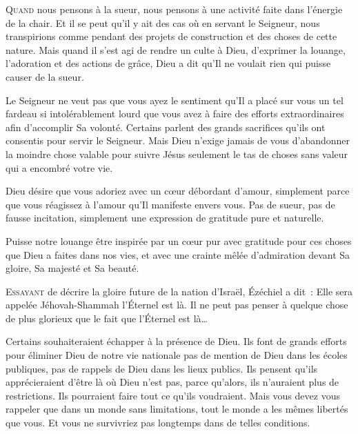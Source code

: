 \lettrine{Q}{uand} nous pensons à la sueur,
 nous pensons à une activité faite dans l'énergie de la chair.
 Et il se peut qu'il y ait des cas où en servant le Seigneur,
 nous transpirions \ocadr comme pendant des projets de construction
 et des choses de cette nature. Mais quand il s'est agi de rendre
 un culte à Dieu, d'exprimer la louange, l'adoration
 et des actions de grâce, Dieu a dit qu'Il ne voulait rien
 qui puisse causer de la sueur. 



Le Seigneur ne veut pas que vous ayez le sentiment qu'Il a placé sur vous
 un tel fardeau si intolérablement lourd que vous avez à faire des efforts
 extraordinaires afin d'accomplir Sa volonté. Certains parlent
 des grands sacrifices 
qu'ils ont consentis pour servir le Seigneur.
 Mais Dieu n'exige jamais de vous d'abandonner la moindre chose valable
 pour suivre Jésus \ocadr seulement le tas de choses sans valeur
 qui a encombré votre vie. 

Dieu désire que vous adoriez avec un c\oe{}ur débordant d'amour,
 simplement parce que vous réagissez à l'amour qu'Il manifeste envers vous.
 Pas de sueur, pas de fausse incitation,
 simplement une expression de gratitude pure et naturelle. 

Puisse notre louange être inspirée par un c\oe{}ur pur
 \ocadr avec gratitude pour ces choses que Dieu a faites dans nos vies, 
et avec une crainte mêlée d'admiration devant Sa gloire,
 Sa majesté et Sa beauté. 

\dvrule






\lettrine{E}{ssayant} de décrire la gloire future de la nation d'Israël,
 Ézéchiel a dit~: 
 \Og Elle sera appelée Jéhovah-Shammah \ocadr l'Éternel est là. \Fg{}
 Il ne peut pas penser à quelque chose de plus glorieux
 que le fait que l'Éternel est là\dots{}

Certains souhaiteraient échapper à la présence de Dieu.
 Ils font de grands efforts pour éliminer Dieu de notre vie nationale
 \ocadr pas de mention de Dieu dans les écoles publiques,
 pas de rappels de Dieu dans les lieux publics.
 Ils pensent qu'ils apprécieraient d'être là où Dieu n'est pas,
 parce qu'alors, ils n'auraient plus de restrictions.
 Ils pourraient faire tout ce qu'ils voudraient.
 Mais vous devez vous rappeler que dans un monde sans limitations,
 tout le monde a les mêmes libertés que vous.
 Et vous ne survivriez pas longtemps dans de telles conditions. 

